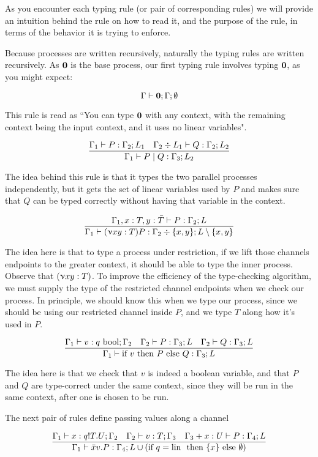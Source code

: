 As you encounter each typing rule (or pair of corresponding rules) we will provide an intuition behind the rule on how to read it, and the purpose of the rule, in terms of the behavior it is trying to enforce.

Because processes are written recursively, naturally the typing rules are written recursively. As $\textbf{0}$ is the base process, our first typing rule involves typing $\textbf{0}$, as you might expect:

$$
\Gamma \vdash \textbf{0} ; \Gamma ; \emptyset
$$

This rule is read as ``You can type $\textbf{0}$ with any context, with the remaining context being the input context, and it uses no linear variables".

$$
\frac{\Gamma_1 \vdash P : \Gamma_2 ; L_1 \quad \Gamma_2 \div L_1 \vdash Q : \Gamma_2 ; L_2}{\Gamma_1 \vdash P \mid Q : \Gamma_3 ; L_2}
$$

The idea behind this rule is that it types the two parallel processes independently, but it gets the set of linear variables used by $P$ and makes sure that $Q$ can be typed correctly without having that variable in the context.

$$
\frac{\Gamma_1, x : T, y : \bar{T} \vdash P : \Gamma_2 ; L}{\Gamma_1 \vdash (\upnu xy : T) P : \Gamma_2 \div \{x,y\} ; L \setminus \{x,y\}}
$$

The idea here is that to type a process under restriction, if we lift those channels endpoints to the greater context, it should be able to type the inner process. Observe that $(\upnu xy : T)$. To improve the efficiency of the type-checking algorithm, we must supply the type of the restricted channel endpoints when we check our process. In principle, we should know this when we type our process, since we should be using our restricted channel inside $P$, and we type $T$ along how it's used in $P$.

$$
\frac{\Gamma_1 \vdash v : q\  \text{bool} ; \Gamma_2 \quad \Gamma_2 \vdash P : \Gamma_3 ; L \quad \Gamma_2 \vdash Q : \Gamma_3 ; L}{\Gamma_1 \vdash \text{if } v \text{ then } P \text{ else } Q : \Gamma_3 ; L}
$$

The idea here is that we check that $v$ is indeed a boolean variable, and that $P$ and $Q$ are type-correct under the same context, since they will be run in the same context, after one is chosen to be run.

The next pair of rules define passing values along a channel

$$
\frac{\Gamma_1 \vdash x : q ! T . U ; \Gamma_2 \quad \Gamma_2 \vdash v : T ; \Gamma_3 \quad \Gamma_3 + x : U \vdash P : \Gamma_4 ; L}{\Gamma_1 \vdash \bar{x}v.P : \Gamma_4 ; L \cup (\text{if } q = \text{lin } \text{ then } \{x\} \text{ else } \emptyset)} \\
$$

